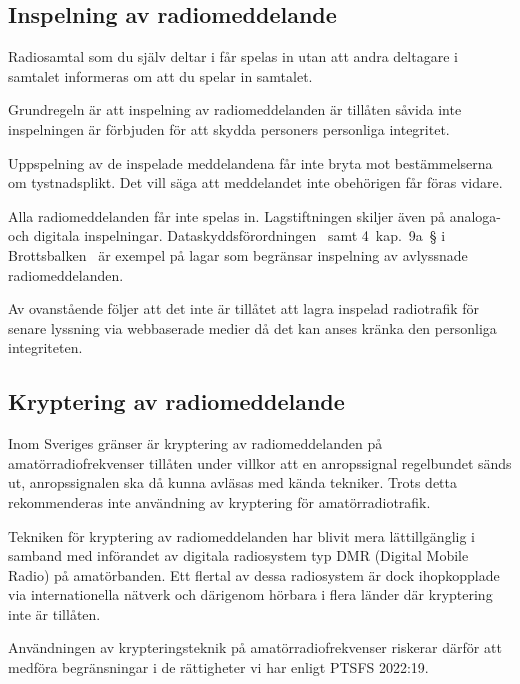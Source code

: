 \subsection{Inspelning av radiomeddelande}

Radiosamtal som du själv deltar i får spelas in utan att andra deltagare i
samtalet informeras om att du spelar in samtalet.

Grundregeln är att inspelning av radiomeddelanden är tillåten såvida inte
inspelningen är förbjuden för att skydda personers personliga integritet.

Uppspelning av de inspelade meddelandena får inte bryta mot bestämmelserna om
tystnadsplikt.
Det vill säga att meddelandet inte obehörigen får föras vidare.

Alla radiomeddelanden får inte spelas in.
Lagstiftningen skiljer även på analoga- och digitala inspelningar.
Dataskyddsförordningen~\cite{GDPR} samt 4~kap.~9a~\S{} i
Brottsbalken~\cite{SFS1962:700} är exempel på lagar som begränsar inspelning av
avlyssnade radiomeddelanden.

Av ovanstående följer att det inte är tillåtet att lagra inspelad radiotrafik
för senare lyssning via webbaserade medier då det kan anses kränka den
personliga integriteten.

\subsection{Kryptering av radiomeddelande}
\label{kryptering av radiomeddelande}

Inom Sveriges gränser är kryptering av radiomeddelanden på amatörradiofrekvenser
tillåten under villkor att en anropssignal regelbundet sänds ut, anropssignalen
ska då kunna avläsas med kända tekniker.
Trots detta rekommenderas inte användning av kryptering för amatörradiotrafik.

Tekniken för kryptering av radiomeddelanden har blivit mera lättillgänglig i
samband med införandet av digitala radiosystem typ DMR (Digital Mobile Radio) på
amatörbanden.
Ett flertal av dessa radiosystem är dock ihopkopplade via internationella
nätverk och därigenom hörbara i flera länder där kryptering inte är tillåten.

Användningen av krypteringsteknik på amatörradiofrekvenser riskerar därför att
medföra begränsningar i de rättigheter vi har enligt PTSFS 2022:19.
